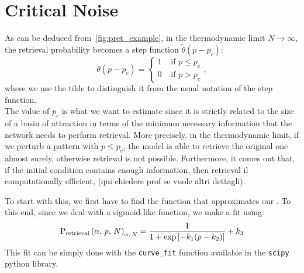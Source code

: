 \documentclass[\rootdir/main.tex]{subfiles}
\begin{document}
\section{Critical Noise}\label{sec:radius:critical_noise}
As can be deduced from~\cref{fig:pret_example}, in the thermodynamic limit $N \to \infty$, the retrieval probability becomes a step function $\tilde{\theta}(p - p_c)$:
\begin{equation*}
    \tilde{\theta}(p - p_c) = \begin{cases}1 & \text { if } p \leq p_c \\ 0 & \text { if } p > p_c\end{cases},
\end{equation*}
where we use the tilde to distinguish it from the usual notation of the step function.\\
The value of $p_c$ is what we want to estimate since it is strictly related to the size of a basin of attraction in terms of the minimum necessary information that the network needs to perform retrieval. More precisely, in the thermodynamic limit, if we perturb a pattern with $p \leq p_c$, the model is able to retrieve the original one almost surely, otherwise retrieval is not possible. Furthermore, it comes out that, if the initial condition contains enough information, then retrieval il computationally efficient, (qui chiedere prof se vuole altri dettagli).

To start with this, we first have to find the function that approximates our . To this end, since we deal with a sigmoid-like function, we make a fit using:
\begin{equation}\label{eq:fit_pret}
     \mathrm{P}_{\text{retrieval}} \left( \alpha, \, p, \, N \right) _{\alpha,\, N} = \frac{1}{1 + \exp \left[ - k_1 (p - k_2) \right]} + k_3
\end{equation}
This fit can be simply done with the \texttt{curve\_fit} function available in the \texttt{scipy} python library.\\
\end{document}
